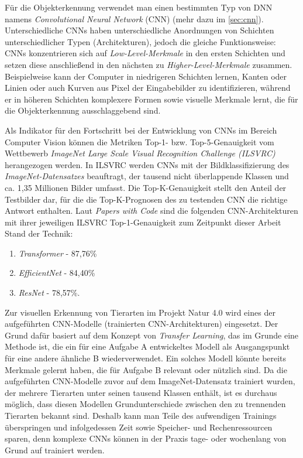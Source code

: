 Für die Objekterkennung verwendet man einen bestimmten Typ von DNN namens \emph{Convolutional Neural Network} (CNN) (mehr dazu im \autoref{sec:cnn}). Unterschiedliche CNNs haben unterschiedliche Anordnungen von Schichten unterschiedlicher Typen (Architekturen), jedoch die gleiche Funktionsweise: CNNs konzentrieren sich auf \emph{Low-Level-Merkmale} in den ersten Schichten und setzen diese anschließend in den nächsten zu \emph{Higher-Level-Merkmale} zusammen. Beispielweise kann der Computer in niedrigeren Schichten lernen, Kanten oder Linien oder auch Kurven aus Pixel der Eingabebilder zu identifizieren, während er in höheren Schichten komplexere Formen sowie visuelle Merkmale lernt, die für die Objekterkennung ausschlaggebend sind.

Als Indikator für den Fortschritt bei der Entwicklung von CNNs im Bereich Computer Vision können die Metriken Top-1- bzw. Top-5-Genauigkeit vom Wettbewerb \emph{ImageNet Large Scale Visual Recognition Challenge (ILSVRC)}\cite{russakovsky2015imagenet} herangezogen werden. In ILSVRC werden CNNs mit der Bildklassifizierung des \emph{ImageNet-Datensatzes} beauftragt, der tausend nicht überlappende Klassen und ca. 1,35 Millionen Bilder umfasst. Die Top-K-Genauigkeit stellt den Anteil der Testbilder dar, für die die Top-K-Prognosen des zu testenden CNN die richtige Antwort enthalten. Laut \emph{Papers with Code} sind die folgenden CNN-Architekturen mit ihrer jeweiligen ILSVRC Top-1-Genauigkeit zum Zeitpunkt dieser Arbeit Stand der Technik:

\begin{enumerate}
	\item \emph{Transformer}\cite{dosovitskiy2021image} - 87,76\%
	\item \emph{EfficientNet}\cite{tan2020efficientnet} - 84,40\%
	\item \emph{ResNet}\cite{he2015deep} - 78,57\%.
\end{enumerate}

Zur visuellen Erkennung von Tierarten im Projekt Natur 4.0 wird eines der aufgeführten CNN-Modelle (trainierten CNN-Architekturen) eingesetzt. Der Grund dafür basiert auf dem Konzept von \emph{Transfer Learning}, das im Grunde eine Methode ist, die ein für eine Aufgabe A entwickeltes Modell als Ausgangspunkt für eine andere ähnliche B wiederverwendet. Ein solches Modell könnte bereits Merkmale gelernt haben, die für Aufgabe B relevant oder nützlich sind. Da die aufgeführten CNN-Modelle zuvor auf dem ImageNet-Datensatz trainiert wurden, der mehrere Tierarten unter seinen tausend Klassen enthält, ist es durchaus möglich, dass diesen Modellen Grundunterschiede zwischen den zu trennenden Tierarten bekannt sind. Deshalb kann man Teile des aufwendigen Trainings überspringen und infolgedessen Zeit sowie Speicher- und Rechenressourcen sparen, denn komplexe CNNs können in der Praxis tage- oder wochenlang von Grund auf trainiert werden\cite[4]{Schroff_2015}\cite[1]{codreanu2017scale}\cite{StanfordDAWNBench,BBVADeepLearning}. 

